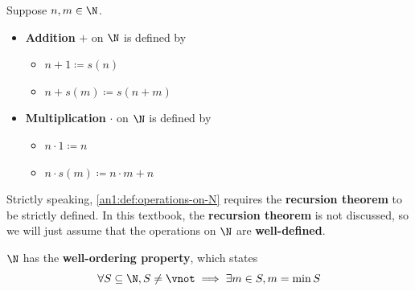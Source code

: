 \begin{definition} \label{an1:def:operations-on-N}
  Suppose $n, m \in \N$.
  \begin{itemize}
    \item \textbf{Addition} $+$ on $\N$ is defined by
          \begin{itemize}
            \item $n + 1 \coloneqq s(n)$
            \item $n + s(m) \coloneqq s(n + m)$
          \end{itemize}
    \item \textbf{Multiplication} $\cdot$ on $\N$ is defined by
          \begin{itemize}
            \item $n \cdot 1 \coloneqq n$
            \item $n \cdot s(m) \coloneqq n \cdot m + n$
          \end{itemize}
  \end{itemize}
\end{definition}

\begin{remark}
  Strictly speaking, \cref{an1:def:operations-on-N} requires the \textbf{recursion theorem} to be strictly defined.
  In this textbook, the \textbf{recursion theorem} is not discussed, so we will just assume that the operations
  on $\N$ are \textbf{well-defined}.
\end{remark}

\begin{theorem} \label{an1:thm:well-ordering-property}
  $\N$ has the \textbf{well-ordering property}, which states
  \[
    \forall S \subseteq \N, S \neq \vnot \implies \exists m \in S, m = \min S
  \]
\end{theorem}

